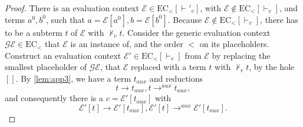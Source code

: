 \compl*
\begin{proof}

There is an evaluation context $\mathcal{E} \in \textrm{EC}_<[\vdash'_v]$, with $\mathcal{E} \not\in \textrm{EC}_<[\vdash_v]$, and terms $a^0, b^0$, such that $a = \mathcal{E}[a^0], b = \mathcal{E}[b^0]$. Because $\mathcal{E} \not\in \textrm{EC}_<[\vdash_v]$, there has to be a subterm $t$ of $\mathcal{E}$ with $\not\vdash_v t$. Consider the generic evaluation context $\mathcal{GE} \in \textrm{EC}_<$ that $\mathcal{E}$ is an instance of, and the order $<$ on its placeholders. Construct an evaluation context $\mathcal{E}' \in \textrm{EC}_<[\vdash_v]$ from $\mathcal{E}$ by replacing the smallest placeholder of $\mathcal{GE}$, that $\mathcal{E}$ replaced with a term $t$ with $\not\vdash_v t$, by the hole $[]$. By \autoref{lem:app3}, we have a term $t_{aux}$ and reductions
\[
t \longrightarrow t_{aux}, t \longrightarrow^{aux} t_{aux},
\]
and consequently there is a $c = \mathcal{E}'[t_{aux}]$ with
\[
\mathcal{E}'[t] \longrightarrow \mathcal{E}'[t_{aux}], \mathcal{E}'[t] \longrightarrow^{aux} \mathcal{E}'[t_{aux}].
\]

\end{proof}

